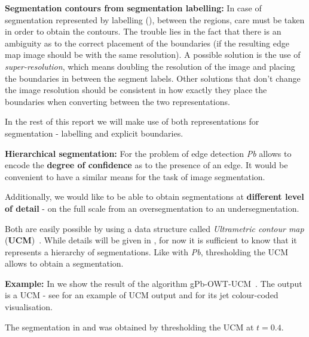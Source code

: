 \textbf{Segmentation contours from segmentation labelling:} In case of segmentation represented by labelling (),  between the regions, care must be taken in order to obtain the contours. The trouble lies in the fact that there is an ambiguity as to the correct placement of the boundaries (if the resulting edge map image should be with the same resolution). A possible solution is the use of {\it super-resolution}, which means doubling the resolution of the image and placing the boundaries in between the segment labels. Other solutions that don't change the image %
resolution should be consistent in how exactly they place the %
boundaries when converting between the two representations.

In the rest of this report we will make use of both representations for segmentation - labelling and explicit boundaries.

\textbf{Hierarchical segmentation:} 
For the problem of edge detection {\it Pb} allows to encode the {\bf degree of confidence} as to the presence of an edge. It would be convenient to have a similar means for the task of image segmentation. 

Additionally, we would like to be able to obtain segmentations at {\bf different level of detail} - on the full scale from an oversegmentation to an undersegmentation. 

Both are %
easily possible by using a data structure called {\it Ultrametric contour map} ({\bf UCM})~\cite{Arbelaez2006boundary}. While details will be given in , for now it is sufficient to know that it represents %
a hierarchy of segmentations. 
Like with {\it Pb}, thresholding the UCM allows to obtain a segmentation.

\textbf{Example:} In  we show the result of the algorithm gPb-OWT-UCM~\cite{Arbelaez11}. The output is a UCM - see  for an example of UCM output and  for its jet colour-coded visualisation.

The segmentation in  and  was obtained by thresholding the UCM at $t=0.4$.

